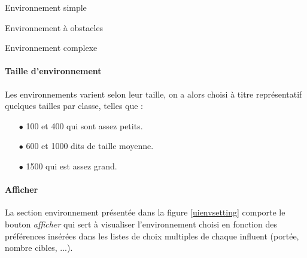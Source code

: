 		\newpage
	\noindent
	\begin{center}
	
	\begin{multicols}{3}
		\begin{minipage}[t]{0.3\textwidth}
			\centering{}
			\xdash[3.5cm]
			Environnement simple
		\end{minipage}\hfill
		\columnbreak
		\begin{minipage}[t]{0.3\textwidth}
			\centering{}
			
			\xdash[3.5cm]
			Environnement à obstacles\\
		\end{minipage}\hfill
		\columnbreak
		\begin{minipage}[t]{0.3\textwidth}			
			\centering{}
			
			\xdash[3.5cm]
			Environnement complexe
		\end{minipage}\hfill
	\end{multicols}
	\label{typss}
\end{center}
	
	
	
	
	\paragraph{Taille d'environnement}
	Les environnements varient selon leur taille, on a alors choisi à titre représentatif quelques tailles par classe, telles que :
	\begin{itemize}
		\item  [$\bullet$]100 et 400 qui sont assez petits.
		\item  [$\bullet$]600 et 1000 dits de taille moyenne.
		\item  [$\bullet$]1500 qui est assez grand.
	\end{itemize}
	
	\paragraph{Afficher}
	La section environnement présentée dans la figure \ref{uienvsetting} comporte le bouton \textit{afficher} qui sert à visualiser l'environnement choisi en fonction des préférences insérées dans les listes de choix multiples de chaque influent (portée, nombre cibles, ...). 
	
